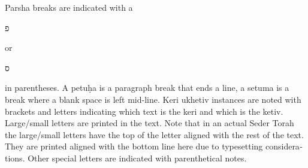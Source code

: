 \begin{minipage}{\textwidth}
\begin{english}
		Parsha breaks are indicated with a \begin{hebrew}\footnotesize פ\normalsize \end{hebrew} or \begin{hebrew}\footnotesize ס\normalsize\end{hebrew} in parentheses. A petu\d{h}a is a paragraph break that ends a line, a setuma is a break where a blank space is left mid-line. Keri ukhetiv instances are noted with brackets and letters indicating which text is the keri and which is the ketiv.\\
		
		Large/small letters are printed in the text.  Note that in an actual Seder Torah the large/small letters have the top of the letter aligned with the rest of the text. They are printed aligned with the bottom line here due to typesetting considerations. Other special letters are indicated with parenthetical notes.
		
	\end{english}
	
\end{minipage}


%
%	
%
